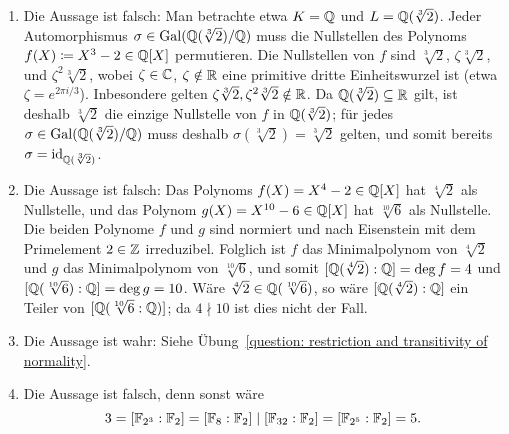\begin{solution}
  \begin{enumerate}
    \item
      Die Aussage ist falsch:
      Man betrachte etwa $K = \mathbb{Q}$ und $L = \mathbb{Q}(\sqrt[3]{2})$.
      Jeder Automorphismus $\sigma \in \operatorname{Gal}(\mathbb{Q}(\sqrt[3]{2})/\mathbb{Q})$ muss die Nullstellen des Polynoms $f(X) \coloneqq X^3-2 \in \mathbb{Q}[X]$ permutieren.
      Die Nullstellen von $f$ sind $\sqrt[3]{2}$, $\zeta \sqrt[3]{2}$, und $\zeta^2 \sqrt[3]{2}$, wobei $\zeta \in \mathbb{C}$, $\zeta \notin \mathbb{R}$ eine primitive dritte Einheitswurzel ist (etwa $\zeta = e^{2 \pi i/3}$).
      Inbesondere gelten $\zeta \sqrt[3]{2}, \zeta^2 \sqrt[3]{2} \notin \mathbb{R}$.
      Da $\mathbb{Q}(\sqrt[3]{2}) \subseteq \mathbb{R}$ gilt, ist deshalb $\sqrt[3]{2}$ die einzige Nullstelle von $f$ in $\mathbb{Q}(\sqrt[3]{2})$;
      für jedes $\sigma \in \operatorname{Gal}(\mathbb{Q}(\sqrt[3]{2})/\mathbb{Q})$ muss deshalb $\sigma(\sqrt[3]{2}) = \sqrt[3]{2}$ gelten, und somit bereits $\sigma = \operatorname{id}_{\mathbb{Q}(\sqrt[3]{2})}$.
      
    \item
      Die Aussage ist falsch:
      Das Polynoms $f(X) = X^4 - 2 \in \mathbb{Q}[X]$ hat $\sqrt[4]{2}$ als Nullstelle, und das Polynom $g(X) = X^{10} - 6 \in \mathbb{Q}[X]$ hat $\sqrt[10]{6}$ als Nullstelle.
      Die beiden Polynome $f$ und $g$ sind normiert und nach Eisenstein mit dem Primelement $2 \in \mathbb{Z}$ irreduzibel.
      Folglich ist $f$ das Minimalpolynom von $\sqrt[4]{2}$ und $g$ das Minimalpolynom von $\sqrt[10]{6}$, und somit $[\mathbb{Q}(\sqrt[4]{2}) : \mathbb{Q}] = \deg f = 4$ und $[\mathbb{Q}(\sqrt[10]{6}) : \mathbb{Q}] = \deg g = 10$.
      Wäre $\sqrt[4]{2} \in \mathbb{Q}(\sqrt[10]{6})$, so wäre $[\mathbb{Q}(\sqrt[4]{2}) : \mathbb{Q}]$ ein Teiler von $[\mathbb{Q}(\sqrt[10]{6} : \mathbb{Q})]$; da $4 \nmid 10$ ist dies nicht der Fall.
      
    \item
      Die Aussage ist wahr:
      Siehe Übung~\ref{question: restriction and transitivity of normality}.
      
    \item
      Die Aussage ist falsch, denn sonst wäre
      \[
              3
        =     [\mathbb{F}_{2^3} : \mathbb{F}_2]
        =     [\mathbb{F}_8 : \mathbb{F}_2]
        \mid  [\mathbb{F}_{32} : \mathbb{F}_2]
        =     [\mathbb{F}_{2^5} : \mathbb{F}_2]
        =     5.
      \]
  \end{enumerate}
\end{solution}


